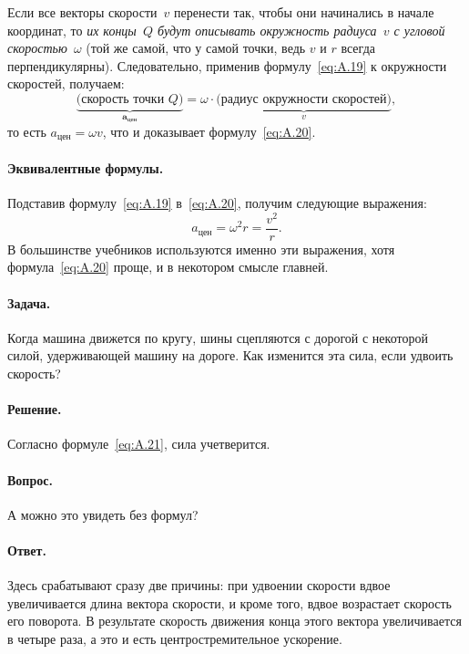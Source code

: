 Если все векторы скорости~$v$ перенести так, чтобы они начинались в начале координат,
то \emph{их концы~$Q$ будут описывать окружность радиуса~$v$ с угловой скоростью~$\omega$}
(той же самой, что у самой точки, ведь $v$ и $r$ всегда перпендикулярны).
Следовательно, применив формулу~\eqref{eq:A.19} к окружности скоростей, получаем:
\[
\underbrace{\text{(скорость точки $Q$)}}_{\mathbf{a}_{\text{цен}}}
=
\omega \cdot
\underbrace{\text{(радиус окружности скоростей)}}_{v},
\]
то есть $a_{\text{цен}}=\omega v$, что и доказывает формулу~\eqref{eq:A.20}.

\paragraph{Эквивалентные формулы.}
Подставив формулу~\eqref{eq:A.19} в~\eqref{eq:A.20}, получим следующие выражения:
\begin{equation}
a_{\text{цен}}=\omega^2 r=\frac{v^2}{r}.
\label{eq:A.21}
\end{equation}
В большинстве учебников используются именно эти выражения, хотя формула~\eqref{eq:A.20} проще, и в некотором смысле главней.

\paragraph{Задача.}
Когда машина движется по кругу, шины сцепляются с дорогой с некоторой силой, удерживающей машину на дороге.
Как изменится эта сила, если удвоить скорость?

\paragraph{Решение.}
Согласно формуле~\eqref{eq:A.21}, сила учетверится.

\paragraph{Вопрос.}
А можно это увидеть без формул?

\paragraph{Ответ.}
Здесь срабатывают сразу две причины:
при удвоении скорости вдвое увеличивается длина вектора скорости, и кроме того, вдвое возрастает скорость его поворота.
В результате скорость движения конца этого вектора увеличивается в четыре раза, а это и есть центростремительное ускорение.

